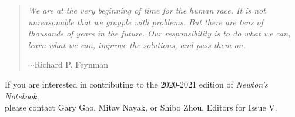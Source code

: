 \documentclass[12pt]{article}
\theoremstyle{definition}
\begin{document}
\begin{quotation}
\textit{We are at the very beginning of time for the human race. It is not unreasonable that we grapple with problems. But there are tens of thousands of years in the future. Our responsibility is to do what we can, learn what we can, improve the solutions, and pass them on.}
	\begin{flushright}
$\sim$Richard P. Feynman
	\end{flushright}
\end{quotation}

\begin{center}
If you are interested in contributing to the 2020-2021 edition of \textit{Newton’s Notebook},\\ 
please contact Gary Gao, Mitav Nayak, or Shibo Zhou, Editors for Issue V.
\end{center}

\end{document}
